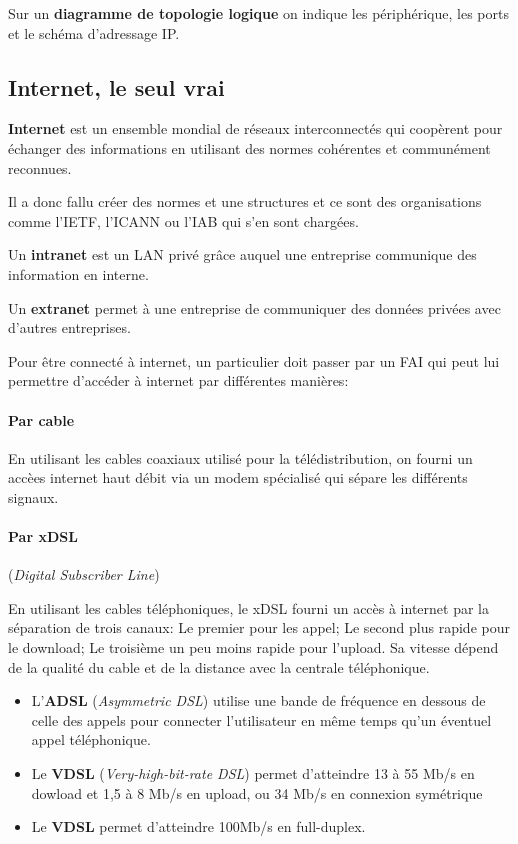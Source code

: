  \smallskip
 \indent
 Sur un \textbf{diagramme de topologie logique} on indique les périphérique, les ports et le schéma d'adressage IP\@.

 \subsection{Internet, le seul vrai}
 \textbf{Internet} est un ensemble mondial de réseaux interconnectés qui coopèrent pour échanger des informations en utilisant des normes cohérentes et communément reconnues.

 \smallskip
 \indent
 Il a donc fallu créer des normes et une structures et ce sont des organisations comme l'IETF, l'ICANN ou l'IAB qui s'en sont chargées.

 \medskip
 \indent
 Un \textbf{intranet} est un LAN privé grâce auquel une entreprise communique des information en interne.

 \smallskip
 \indent
 Un \textbf{extranet} permet à une entreprise de communiquer des données privées avec d'autres entreprises.

 \medskip
 \indent
 Pour être connecté à internet, un particulier doit passer par un FAI qui peut lui permettre d'accéder à internet par différentes manières:

 \paragraph{Par cable}\leavevmode

 \smallskip

 En utilisant les cables coaxiaux utilisé pour la télédistribution, on fourni un accèes internet haut débit via un modem spécialisé qui sépare les différents signaux.

 \paragraph{Par xDSL} (\textit{Digital Subscriber Line})\leavevmode

 \smallskip

 En utilisant les cables téléphoniques, le xDSL fourni un accès à internet par la séparation de trois canaux: Le premier pour les appel; Le second plus rapide pour le download; Le troisième un peu moins rapide pour l'upload. Sa vitesse dépend de la qualité du cable et de la distance avec la centrale téléphonique.
 \begin{itemize}
	 \item L'\textbf{ADSL} (\textit{Asymmetric DSL}) utilise une bande de fréquence en dessous de celle des appels pour connecter l'utilisateur en même temps qu'un éventuel appel téléphonique.
	 \item Le \textbf{VDSL} (\textit{Very-high-bit-rate DSL}) permet d'atteindre 13 à 55 Mb/s en dowload et 1,5 à 8 Mb/s en upload, ou 34 Mb/s en connexion symétrique
	 \item Le \textbf{VDSL} permet d'atteindre 100Mb/s en full-duplex.
 \end{itemize}

